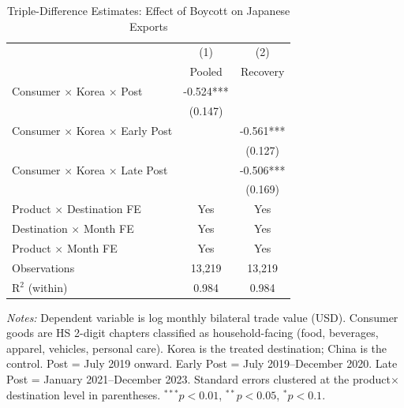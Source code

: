 \begin{table}[htbp]
\centering
\caption{Triple-Difference Estimates: Effect of Boycott on Japanese Exports}
\label{tab:ddd}
\begin{threeparttable}
\begin{tabular}{lcc}
\toprule
 & (1) & (2) \\
 & Pooled & Recovery \\
\midrule
Consumer $\times$ Korea $\times$ Post & -0.524*** & \\
 & (0.147) & \\[6pt]
Consumer $\times$ Korea $\times$ Early Post & & -0.561*** \\
 & & (0.127) \\
Consumer $\times$ Korea $\times$ Late Post & & -0.506*** \\
 & & (0.169) \\[6pt]
\midrule
Product $\times$ Destination FE & Yes & Yes \\
Destination $\times$ Month FE & Yes & Yes \\
Product $\times$ Month FE & Yes & Yes \\
Observations & 13,219 & 13,219 \\
R$^2$ (within) & 0.984 & 0.984 \\
\bottomrule
\end{tabular}
\begin{tablenotes}[flushleft]\footnotesize
\item \textit{Notes:} Dependent variable is log monthly bilateral trade value (USD). Consumer goods are HS 2-digit chapters classified as household-facing (food, beverages, apparel, vehicles, personal care). Korea is the treated destination; China is the control. Post = July 2019 onward. Early Post = July 2019--December 2020. Late Post = January 2021--December 2023. Standard errors clustered at the product$\times$destination level in parentheses. $^{***}p<0.01$, $^{**}p<0.05$, $^{*}p<0.1$.
\end{tablenotes}
\end{threeparttable}
\end{table}
